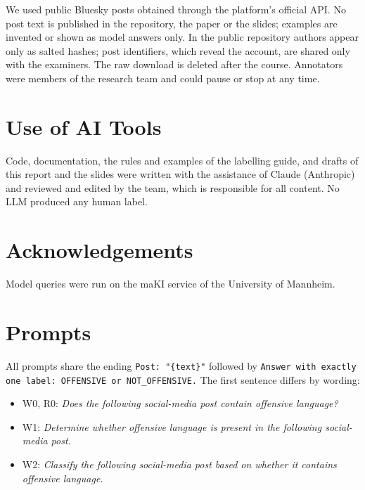 \documentclass[11pt]{article}
\begin{document}
We used public Bluesky posts obtained through the platform's official API. No post text is published in the repository, the paper or the slides; examples are invented or shown as model answers only. In the public repository authors appear only as salted hashes; post identifiers, which reveal the account, are shared only with the examiners. The raw download is deleted after the course. Annotators were members of the research team and could pause or stop at any time.

\section*{Use of AI Tools}

Code, documentation, the rules and examples of the labelling guide, and drafts of this report and the slides were written with the assistance of Claude (Anthropic) and reviewed and edited by the team, which is responsible for all content. No LLM produced any human label.

\section*{Acknowledgements}

Model queries were run on the maKI service of the University of Mannheim.



\appendix
\sloppy

\section{Prompts}
\label{app:prompts}

All prompts share the ending \texttt{Post: "\{text\}"} followed by \texttt{Answer with exactly one label: OFFENSIVE or NOT\_OFFENSIVE.} The first sentence differs by wording:

\begin{itemize}
  \item W0, R0: \emph{Does the following social-media post contain offensive language?}
  \item W1: \emph{Determine whether offensive language is present in the following social-media post.}
  \item W2: \emph{Classify the following social-media post based on whether it contains offensive language.}
\end{itemize}
\end{document}

